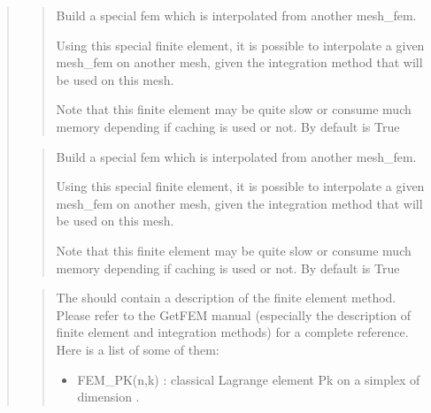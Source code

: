 \documentclass[a4paper,11pt,english]{sphinxmanual}
\begin{document}
\sphinxAtStartPar
{}
\begin{quote}

\sphinxAtStartPar
{}
\begin{quote}

\sphinxAtStartPar
Build a special fem which is interpolated from another mesh\_fem.

\sphinxAtStartPar
Using this special finite element, it is possible to interpolate a given
mesh\_fem  on another mesh, given the integration method 
that will be used on this mesh.

\sphinxAtStartPar
Note that this finite element may be quite slow or consume much
memory depending if caching is used or not. By default  is
True
\end{quote}

\sphinxAtStartPar
{}
\begin{quote}

\sphinxAtStartPar
Build a special fem which is interpolated from another mesh\_fem.

\sphinxAtStartPar
Using this special finite element, it is possible to interpolate a given
mesh\_fem  on another mesh, given the integration method 
that will be used on this mesh.

\sphinxAtStartPar
Note that this finite element may be quite slow or consume much
memory depending if caching is used or not. By default  is
True
\end{quote}

\sphinxAtStartPar
{}
\begin{quote}

\sphinxAtStartPar
The  should contain a description of the finite element
method. Please refer to the GetFEM manual (especially the
description of finite element and integration methods) for a complete
reference. Here is a list of some of them:
\begin{itemize}
\item {} 
\sphinxAtStartPar
FEM\_PK(n,k) :
classical Lagrange element Pk on a simplex of dimension .


\end{itemize}
\end{quote}
\end{quote}
\end{document}
